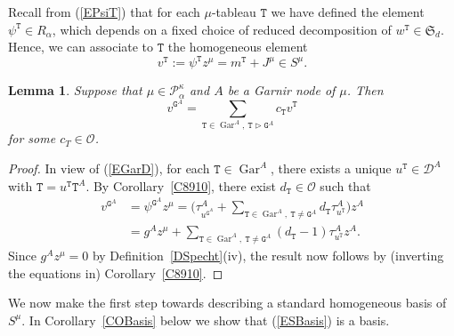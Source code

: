 \documentclass[twoside,11pt,reqno]{amsart}
\numberwithin{equation}{section}
\newtheorem{Lemma}[equation]{Lemma}
\theoremstyle{definition}  %
\DeclareMathOperator\gdom {\triangleright}
\newcommand{\0}{{\bar 0}}
\newcommand{\1}{{\bar 1}}
\newcommand{\al}{\alpha}
\def\Si{\mathfrak{S}}
\newcommand{\D}{{\mathscr D}}
\newcommand\Par[1][]{{\mathscr P}^{\kappa#1}}
\def\T{{\mathtt T}}
\def\G{{\mathtt G}}
\def\Gar{{\operatorname{Gar}}}
\renewcommand\O{\mathcal O}
\begin{document}
Recall from (\ref{EPsiT}) that for each $\mu$-tableau $\T$ we have defined the element $\psi^\T\in R_\al$,
which depends on a fixed choice of reduced decomposition of $w^\T\in\Si_d$. Hence, we can associate to $\T$
the homogeneous element 
$$ v^\T:=\psi^\T z^\mu =m^\T+J^\mu  \in S^\mu.  $$



\begin{Lemma} \label{L8910}%
Suppose that  $\mu\in\Par_\al$ and $A$ be a Garnir node of $\mu$. Then 
$$
v^{\G^A}=\sum_{\T\in\Gar^A,\ \T\gdom\G^A} c_\T v^\T
$$
for some $c_T\in\O$. 
\end{Lemma}
\begin{proof}
In view of (\ref{EGarD}), for each $\T\in\Gar^A$, there exists a unique $u^\T\in\D^A$ with $\T=u^\T\T^A$. By Corollary~\ref{C8910}, there exist $d_\T\in \O$ such that 
\begin{align*}
v^{\G^A}&=\psi^{\G^A}z^\mu=\Big(\tau_{u^{\G^A}}^A+\sum_{\T\in\Gar^A,\ \T\neq\G^A}d_\T\tau_{u^\T}^A\Big)z^A
\\
&=g^A z^\mu+\sum_{\T\in\Gar^A,\ \T\neq\G^A}(d_\T-1)\tau_{u^\T}^Az^A.
\end{align*}
Since $g^A z^\mu=0$ by Definition~\ref{DSpecht}(iv), the result now follows by (inverting the equations in) Corollary~\ref{C8910}.
\end{proof}

We now make the first step towards describing a standard homogeneous basis of $S^\mu$. In Corollary~\ref{COBasis} below we show that (\ref{ESBasis}) is a basis. 
\end{document}
